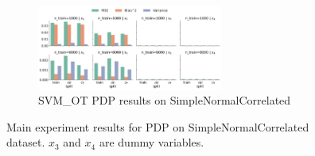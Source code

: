 \documentclass[runningheads]{llncs}
\begin{document}
\begin{figure}[h!]
\begin{subfigure}[b]{\textwidth}
        \centering
        \includegraphics[width=0.67\textwidth]{img/SNC-all/feature_effect_errors_pdp_SVM_OT.png}
        \caption{SVM\_OT PDP results on SimpleNormalCorrelated}
    \end{subfigure}
    \caption{Main experiment results for PDP on SimpleNormalCorrelated dataset. $x_3$ and $x_4$ are dummy variables.}
    \label{fig:pdp-results-snc-all}  %
\end{figure}
\end{document}
